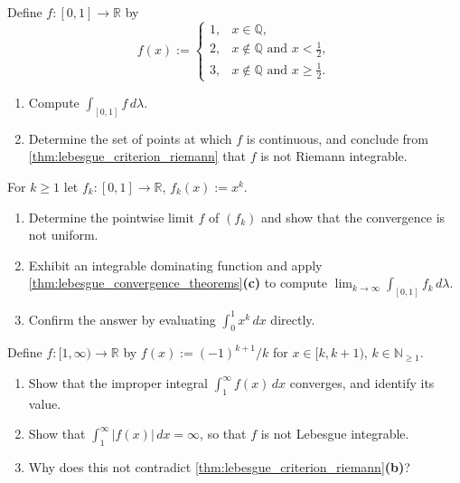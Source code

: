 \begin{aiexercise}
\label{ex:ai_lebesgue_three_valued}
Define $f : [0,1] \to \mathbb{R}$ by
\[f(x) := \begin{cases}
1, & x \in \mathbb{Q}, \\
2, & x \notin \mathbb{Q} \text{ and } x < \tfrac12, \\
3, & x \notin \mathbb{Q} \text{ and } x \ge \tfrac12.
\end{cases}\]
\begin{enumerate}[label=\textbf{(\alph*)}]
  \item Compute $\int_{[0,1]} f \,d\lambda$.
  \item Determine the set of points at which $f$ is continuous, and conclude from
    \cref{thm:lebesgue_criterion_riemann} that $f$ is not Riemann integrable.
\end{enumerate}
\end{aiexercise}

\begin{aiexercise}
\label{ex:ai_dominated_beats_uniform}
For $k \ge 1$ let $f_k : [0,1] \to \mathbb{R}$, $f_k(x) := x^k$.
\begin{enumerate}[label=\textbf{(\alph*)}]
  \item Determine the pointwise limit $f$ of $(f_k)$ and show that the convergence is not uniform.
  \item Exhibit an integrable dominating function and apply
    \cref{thm:lebesgue_convergence_theorems}\textbf{(c)} to compute
    $\lim_{k\to\infty}\int_{[0,1]} f_k\,d\lambda$.
  \item Confirm the answer by evaluating $\int_0^1 x^k\,dx$ directly.
\end{enumerate}
\end{aiexercise}

\begin{aiexercise}
\label{ex:ai_improper_not_lebesgue}
Define $f : [1,\infty) \to \mathbb{R}$ by $f(x) := (-1)^{k+1}/k$ for $x \in [k,k+1)$,
$k \in \mathbb{N}_{\ge1}$.
\begin{enumerate}[label=\textbf{(\alph*)}]
  \item Show that the improper integral $\int_1^\infty f(x)\,dx$ converges, and identify its value.
  \item Show that $\int_1^\infty \lvert f(x)\rvert\,dx = \infty$, so that $f$ is not Lebesgue
    integrable.
  \item Why does this not contradict \cref{thm:lebesgue_criterion_riemann}\textbf{(b)}?
\end{enumerate}
\end{aiexercise}
